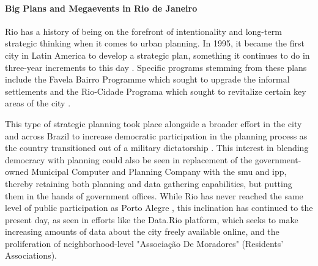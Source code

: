 \paragraph{Big Plans and Megaevents in Rio de Janeiro} \label{sec:rio-plans} \leavevmode\newline

Rio has a history of being on the forefront of intentionality and long-term strategic thinking when it comes to urban planning. In 1995, it became the first city in Latin America to develop a strategic plan, something it continues to do in three-year increments to this day \cite{prefeituradacidadedoriodejaneiroPLANOESTRATEGICOCIDADE2017}. Specific programs stemming from these plans include the Favela Bairro Programme which sought to upgrade the informal settlements and the Rio-Cidade Programa which sought to revitalize certain key areas of the city \cite{aciolyc.ReviewingUrbanRevitalisation2001}.

This type of strategic planning took place alongside a broader effort in the city and across Brazil to increase democratic participation in the planning process as the country transitioned out of a military dictatorship \cite{aciolyc.ReviewingUrbanRevitalisation2001}. This interest in blending democracy with planning could also be seen in replacement of the government-owned Municipal Computer and Planning Company with the \ac{smu} and \ac{ipp}, thereby retaining both planning and data gathering capabilities, but putting them in the hands of government offices. While Rio has never reached the same level of public participation as Porto Alegre \cite{desousasantosParticipatoryBudgetingPorto1998}, this inclination has continued to the present day, as seen in efforts like the Data.Rio platform, which seeks to make increasing amounts of data about the city freely available online, and the proliferation of neighborhood-level "Associação De Moradores" (Residents' Associations).

